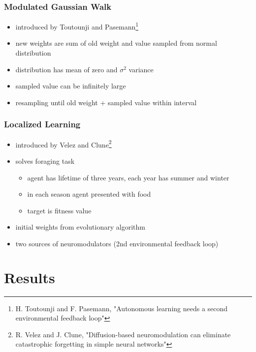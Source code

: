 \documentclass[14pt]{beamer}
\theoremstyle{remark}
\begin{document}
\begin{frame}[t]
    \frametitle{Modulated Gaussian Walk}
    \begin{itemize}
        \item introduced by Toutounji and Pasemann\footnote{H. Toutounji and
        F. Pasemann, "Autonomous learning needs a second environmental feedback
        loop"\cite{Toutounji2016}}
        \vfill
  	    \item new weights are sum of old weight and value sampled from normal distribution
        \vfill
        \item distribution has mean of zero and \(\sigma^2\) variance
        \vfill
        \item sampled value can be infinitely large
        \vfill
        \item resampling until old weight + sampled value within interval
	\end{itemize}
\end{frame}

\begin{frame}[t]
    \frametitle{Localized Learning}
    \begin{itemize}
        \item introduced by Velez and Clune\footnote{R. Velez and J. Clune,
        "Diffusion-based neuromodulation can eliminate catastrophic forgetting
        in simple neural networks"\cite{Velez2017}}
        \vfill
  	    \item solves foraging task
        \begin{itemize}
            \item agent has lifetime of three years, each year has summer and winter
            \item in each season agent presented with food
            \item target is fitness value
        \end{itemize}
        \vfill
        \item initial weights from evolutionary algorithm
        \vfill
        \item two sources of neuromodulators (2nd environmental feedback loop)
	\end{itemize}
\end{frame}

\section{Results}
\end{document}
